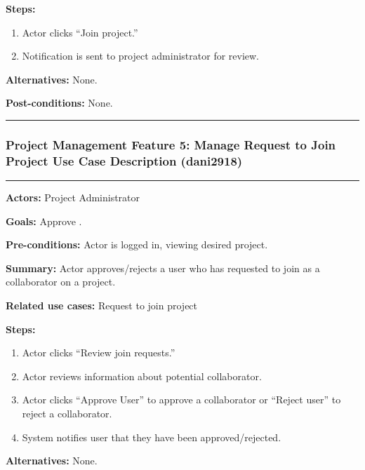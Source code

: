 \documentclass[twoside,letterpaper]{article}
\begin{document}
	\noindent \textbf{Steps:} \begin{enumerate}
	  \item Actor clicks ``Join project.''
	  \item Notification is sent to project administrator for review.
	 \end{enumerate}
	\noindent \textbf{Alternatives:} None. \newline
	 
	\noindent \textbf{Post-conditions:} None. \newline
	\vspace{8pt}
	\hrule
	
	\newpage
	
	
	\subsubsection[Project Management Feature 5: Manage Request to Join Project Use Case Description (dani2918)]{\rmfamily\bfseries\color{black}
		Project Management Feature 5: Manage Request to Join Project Use Case Description (dani2918)}
	\hypertarget{RefHeading22059017292}{}
	\bigskip
	
	\vspace{2pt}
	\hrule
	\vspace{8pt}
	\noindent \textbf{Actors:} Project Administrator \newline
	 
	\noindent \textbf{Goals:} Approve . \newline
	
	\noindent \textbf{Pre-conditions:} Actor is logged in, viewing desired project.  \newline
	
	\noindent \textbf{Summary:} Actor approves/rejects a user who has requested to join as a collaborator on a project.\newline
	
	\noindent \textbf{Related use cases:} Request to join project \newline
	
	\noindent \textbf{Steps:} \begin{enumerate}
	  \item Actor clicks ``Review join requests.''
	  \item Actor reviews information about potential collaborator.
	  \item Actor clicks ``Approve User'' to approve a collaborator or ``Reject user'' to reject a collaborator.
	  \item System notifies user that they have been approved/rejected.
	 \end{enumerate}
	 \textbf{Alternatives:} None. \newline
	 
\end{document}

